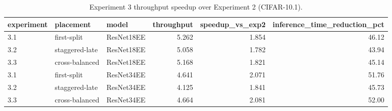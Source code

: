 \begin{table}
\centering
\caption{Experiment 3 throughput speedup over Experiment 2 (CIFAR-10.1).}
\label{tab:exp2-exp3-throughput-speedup-cifar10-1}
\begin{tabular}{lllrrr}
\toprule
experiment &      placement &      model &  throughput &  speedup\_vs\_exp2 &  inference\_time\_reduction\_pct \\
\midrule
       3.1 &    first-split & ResNet18EE &       5.262 &            1.854 &                         46.12 \\
       3.2 & staggered-late & ResNet18EE &       5.058 &            1.782 &                         43.94 \\
       3.3 & cross-balanced & ResNet18EE &       5.168 &            1.821 &                         45.14 \\
       3.1 &    first-split & ResNet34EE &       4.641 &            2.071 &                         51.76 \\
       3.2 & staggered-late & ResNet34EE &       4.125 &            1.841 &                         45.73 \\
       3.3 & cross-balanced & ResNet34EE &       4.664 &            2.081 &                         52.00 \\
\bottomrule
\end{tabular}
\end{table}
